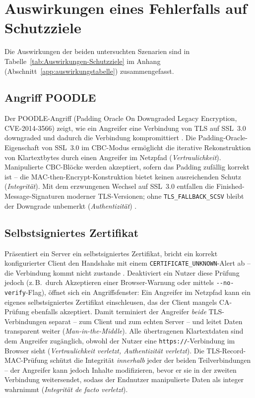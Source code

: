 \section{Auswirkungen eines Fehlerfalls auf Schutzziele}

Die Auswirkungen der beiden untersuchten Szenarien sind in Tabelle~\ref{tab:Auswirkungen-Schutzziele} im Anhang (Abschnitt~\ref{app:auswirkungstabelle}) zusammengefasst.

\subsection*{Angriff POODLE} 
Der POODLE-Angriff (Padding Oracle On Downgraded Legacy Encryption, CVE-2014-3566) zeigt, wie ein Angreifer eine Verbindung von TLS auf SSL~3.0 downgraded und dadurch die Verbindung kompromittiert \cite{cve-poodle}. Die Padding-Oracle-Eigenschaft von SSL~3.0 im CBC-Modus ermöglicht die iterative Rekonstruktion von Klartextbytes durch einen Angreifer im Netzpfad (\textit{Vertraulichkeit}). Manipulierte CBC-Blöcke werden akzeptiert, sofern das Padding zufällig korrekt ist -- die MAC-then-Encrypt-Konstruktion bietet keinen ausreichenden Schutz (\textit{Integrität}). Mit dem erzwungenen Wechsel auf SSL~3.0 entfallen die Finished-Message-Signaturen moderner TLS-Versionen; ohne \texttt{TLS\_FALLBACK\_SCSV} bleibt der Downgrade unbemerkt (\textit{Authentizität}) \cite{thomas-krenn-poodle}.

\subsection*{Selbstsigniertes Zertifikat} 

Präsentiert ein Server ein selbstsigniertes Zertifikat, bricht ein korrekt konfigurierter Client den Handshake mit einem \texttt{CERTIFICATE\_UNKNOWN}-Alert ab -- die Verbindung kommt nicht zustande \cite{mdndocs}. Deaktiviert ein Nutzer diese Prüfung jedoch (z.\,B.\ durch Akzeptieren einer Browser-Warnung oder mittels \texttt{-{}-no-verify}-Flag), öffnet sich ein Angriffsfenster: Ein Angreifer im Netzpfad kann ein eigenes selbstsigniertes Zertifikat einschleusen, das der Client mangels CA-Prüfung ebenfalls akzeptiert. Damit terminiert der Angreifer \emph{beide} TLS-Verbindungen separat -- zum Client und zum echten Server -- und leitet Daten transparent weiter (\textit{Man-in-the-Middle}). Alle übertragenen Klartextdaten sind dem Angreifer zugänglich, obwohl der Nutzer eine \texttt{https://}-Verbindung im Browser sieht (\textit{Vertraulichkeit verletzt, Authentizität verletzt}). Die TLS-Record-MAC-Prüfung schützt die Integrität \emph{innerhalb} jeder der beiden Teilverbindungen -- der Angreifer kann jedoch Inhalte modifizieren, bevor er sie in der zweiten Verbindung weitersendet, sodass der Endnutzer manipulierte Daten als integer wahrnimmt (\textit{Integrität de facto verletzt}).

